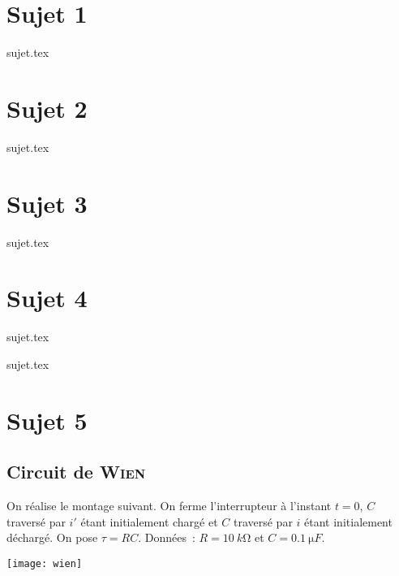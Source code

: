 \documentclass[a4paper, 11pt]{book}
\begin{document}

\chapter{Sujet 1}

\resetQ
{sujet.tex}


\chapter{Sujet 2}

\resetQ
{sujet.tex}


\chapter{Sujet 3}

\resetQ
{sujet.tex}

\chapter{Sujet 4}

\resetQ
{sujet.tex}

\resetQ
{sujet.tex}

\chapter{Sujet 5}
\resetQ
\section{Circuit de \textsc{Wien}}

\begin{minipage}{0.60\linewidth}
	On réalise le montage suivant. On ferme l'interrupteur à l'instant $t =0$,
	$C$ traversé par $i'$ étant initialement chargé et $C$ traversé par $i$
	étant initialement déchargé.\smallbreak
	On pose $\tau = RC$. Données~: $R = \SI{10}{k\ohm}$ et $C = \SI{0.1}{\micro
			F}$.
\end{minipage}
\begin{minipage}{0.40\linewidth}
	\centering
	\texttt{[image: wien]}
\end{minipage}
\end{document}

